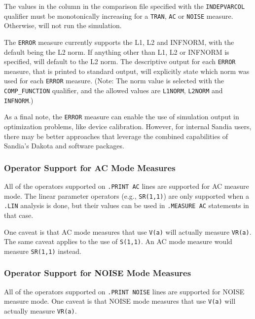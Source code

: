 \begin{XyceItemize}
  \item The values in the column in the comparison file specified with
    the {\tt INDEPVARCOL} qualifier must be monotonically increasing
    for a {\tt TRAN}, {\tt AC} or {\tt NOISE} measure.  Otherwise,
    \Xyce{} will not run the simulation.

  \item The {\tt ERROR} measure currently supports the L1, L2 and
    INFNORM, with the default being the L2 norm.  If anything other
    than L1, L2 or INFNORM is specified, \Xyce{} will default to the
    L2 norm.  The descriptive output for each {\tt ERROR} measure,
    that is printed to standard output, will explicitly state which
    norm was used for each {\tt ERROR} measure.  (Note: The norm value
    is selected with the {\tt COMP\_FUNCTION} qualifier, and the
    allowed values are {\tt L1NORM}, {\tt L2NORM} and {\tt INFNORM}.)

\end{XyceItemize}

As a final note, the \texttt{ERROR} measure can enable the use
of \Xyce{} simulation output in optimization problems, like device
calibration.  However, for internal Sandia users, there may be better
approaches that leverage the combined capabilities of Sandia's Dakota
and \Xyce{} software packages.

\subsubsection{Operator Support for AC Mode Measures}
\label{Measure_AC_Op_Support}
All of the operators supported on \texttt{.PRINT AC} lines are supported
for AC measure mode.  The linear parameter operators (e.g., \texttt{SR(1,1)})
are only supported when a \texttt{.LIN} analysis is done, but their values
can be used in \texttt{.MEASURE AC} statements in that case.

One caveat is that AC mode measures that use \texttt{V(a)} will actually
measure \texttt{VR(a)}. The same caveat applies to the use of \texttt{S(1,1)}.
An AC mode measure would measure \texttt{SR(1,1)} instead.

\subsubsection{Operator Support for NOISE Mode Measures}
\label{Measure_Noise_Op_Support}
All of the operators supported on \texttt{.PRINT NOISE} lines are supported
for NOISE measure mode.  One caveat is that NOISE mode measures that use
\texttt{V(a)} will actually measure \texttt{VR(a)}.

